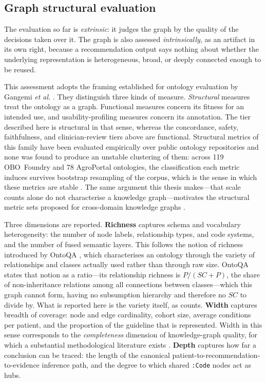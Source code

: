 \subsection{Graph structural evaluation}
\label{sec:structural}
The evaluation so far is \emph{extrinsic}: it judges the graph by the quality of the
decisions taken over it. The graph is also assessed \emph{intrinsically}, as an artifact in
its own right, because a recommendation output says nothing about whether the underlying
representation is heterogeneous, broad, or deeply connected enough to be reused.

This assessment adopts the framing established for ontology evaluation by Gangemi \textit{et
al.} \cite{gangemi2006}. They distinguish three kinds of measure. \emph{Structural} measures
treat the ontology as a graph. Functional measures concern its fitness for an intended use,
and usability-profiling measures concern its annotation. The tier described here is
structural in that sense, whereas the concordance, safety, faithfulness, and clinician-review
tiers above are functional. Structural metrics of this family have been evaluated empirically over
public ontology repositories and none was found to produce an unstable clustering of them: across 119 OBO~Foundry
and 78 AgroPortal ontologies, the classification each metric induces survives bootstrap
resampling of the corpus, which is the sense in which these metrics are stable
\cite{franco2020}.
The same argument this thesis makes---that scale counts alone do not
characterise a knowledge graph---motivates the structural metric sets proposed for
cross-domain knowledge graphs \cite{seo2022}.

Three dimensions are reported. \textbf{Richness} captures schema and vocabulary
heterogeneity: the number of node labels, relationship types, and code systems, and the
number of fused semantic layers. This follows the notion of richness introduced by OntoQA
\cite{tartir2005}, which characterises an ontology through the variety of relationships and
classes actually used rather than through raw size. OntoQA states that notion as a
ratio---its relationship richness is $P/(SC+P)$, the share of non-inheritance relations
among all connections between classes---which this graph cannot form, having no subsumption
hierarchy and therefore no $SC$ to divide by. What is reported here is the variety itself,
as counts. \textbf{Width} captures breadth of
coverage: node and edge cardinality, cohort size, average conditions per patient, and the
proportion of the guideline that is represented. Width in this sense corresponds to the
\emph{completeness} dimension of knowledge-graph quality, for which a substantial
methodological literature exists \cite{issa2021,xue2023}. \textbf{Depth} captures how far a
conclusion can be traced: the length of the canonical
patient-to-recommendation-to-evidence inference path, and the degree to which shared
\texttt{:Code} nodes act as hubs.

